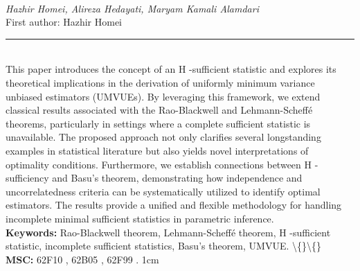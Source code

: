 \documentclass[10pt,twoside]{article}
\begin{document}
\noindent\begin{minipage}[t][\textheight]{\textwidth}
\\[0.35em]
{\itshape Hazhir Homei, Alireza Hedayati, Maryam Kamali Alamdari}\\[0.2em]
{\footnotesize First author: Hazhir Homei}\\[0.45em]
\noindent\rule{\textwidth}{0.3pt}\\[0.4em]
{\footnotesize  This paper introduces the concept of an H -sufficient statistic and explores its theoretical implications in the derivation of uniformly minimum variance unbiased estimators (UMVUEs). By leveraging this framework, we extend classical results associated with the Rao-Blackwell and Lehmann-Scheffé theorems, particularly in settings where a complete sufficient statistic is unavailable. The proposed approach not only clarifies several longstanding examples in statistical literature but also yields novel interpretations of optimality conditions. Furthermore, we establish connections between H -sufficiency and Basu's theorem, demonstrating how independence and uncorrelatedness criteria can be systematically utilized to identify optimal estimators. The results provide a unified and flexible methodology for handling incomplete minimal sufficient statistics in parametric inference.}\\[0.4em]
{\footnotesize\bfseries Keywords:} {\footnotesize Rao-Blackwell theorem, Lehmann-Scheffé theorem, H -sufficient statistic, incomplete sufficient statistics, Basu's theorem, UMVUE. \textbackslash\{\}\textbackslash\{\}}\\[0.15em]
{\footnotesize\bfseries MSC:} {\footnotesize 62F10 , 62B05 , 62F99 . 1cm}\\
\vfill
\end{minipage}
\newpage
\end{document}
